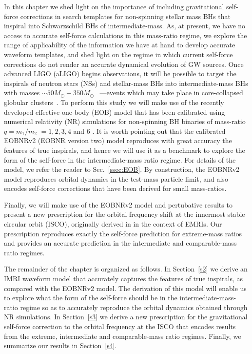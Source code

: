  
In this chapter we shed light on the importance of including gravitational self-force corrections in search templates for non-spinning stellar mass BHs that inspiral into Schwarzschild BHs of intermediate-mass. As, at present, we have no access to accurate self-force calculations in this mass-ratio regime, we explore the range of applicability of the information we have at hand to develop accurate waveform templates, and shed light on the regime in which current self-force corrections do not render an accurate dynamical evolution of GW sources. 
Once advanced LIGO (aLIGO) begins observations, it will be possible to target the inspirals of neutron stars (NSs) and stellar-mass BHs into intermediate-mass BHs with masses  \(\sim 50M_{\odot} - 350M_{\odot}\)~\cite{brown} ---events which may take place in core-collapsed globular clusters~\cite{evidence}.  To 
perform this study we will make use of the recently developed effective-one-body (EOB) model that has been calibrated using numerical relativity (NR)  simulations for non-spinning BH binaries of mass-ratio    \(q=m_1/m_2\) \(=1,2,3,4\) and 6 \cite{BuonannoEOBv2Main}. It is worth pointing out that the calibrated EOBNRv2 (EOBNR version two) model reproduces with great accuracy the features of true inspirals, and hence we will use it as a benchmark to explore the form of the self-force in the intermediate-mass ratio regime. For details of the model, we refer the reader to 
Sec.~\ref{ssec:EOB}.
By construction, the EOBNRv2 model reproduces orbital dynamics in the test-mass particle limit, and also encodes self-force corrections that have been derived for small mass-ratios.

Finally, we will make use of the EOBNRv2 model and pertubative results to present a new prescription for the orbital frequency shift at the innermost stable circular orbit (ISCO), originally derived in \cite{inner} in the context of EMRIs. Our prescription reproduces exactly the self-force prediction for extreme-mass ratios and provides an accurate prediction in the intermediate and comparable-mass ratio regimes.   

The remainder of the chapter is organized as follows. 
In Section~\ref{s2} we derive an IMRI waveform model that accurately captures the features of true inspirals, as compared with the EOBNRv2 model. The derivation of this model will enable us to explore what the form of the self-force should be in the intermediate-mass-ratio regime so as to accurately reproduce the orbital dynamics obtained through NR simulations. In Section~\ref{s3} we derive a new prescription for the gravitational self-force correction to the orbital frequency at the ISCO that encodes results from the extreme, intermediate and comparable-mass ratio regimes. Finally, we summarize our results in Section~\ref{s4}.


